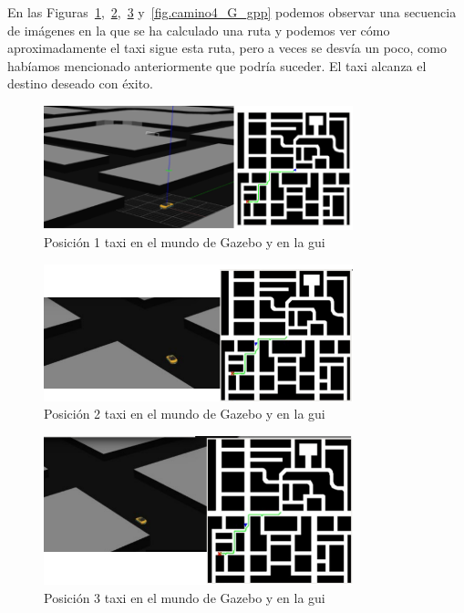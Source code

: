 En las Figuras~\ref{fig.camino1_G_gpp},~\ref{fig.camino2_G_gpp},~\ref{fig.camino3_G_gpp} y~\ref{fig.camino4_G_gpp} podemos observar una secuencia de imágenes en la que se ha calculado una ruta y podemos ver cómo aproximadamente el taxi sigue esta ruta, pero a veces se desvía un poco, como habíamos mencionado anteriormente que podría suceder. El taxi alcanza el destino deseado con éxito.

\begin{figure}[H]
  \begin{center}
    \includegraphics[width=0.8\textwidth]{figures/GPP/camino1_G.png}
		\caption{Posición 1 taxi en el mundo de Gazebo y en la \acrshort{gui}}
		\label{fig.camino1_G_gpp}
		\end{center}
\end{figure}

\begin{figure}[H]
  \begin{center}
    \includegraphics[width=0.8\textwidth]{figures/GPP/camino2_G.png}
		\caption{Posición 2 taxi en el mundo de Gazebo y en la \acrshort{gui}}
		\label{fig.camino2_G_gpp}
		\end{center}
\end{figure}

\begin{figure}[H]
  \begin{center}
    \includegraphics[width=0.8\textwidth]{figures/GPP/camino3_G.png}
		\caption{Posición 3 taxi en el mundo de Gazebo y en la \acrshort{gui}}
		\label{fig.camino3_G_gpp}
		\end{center}
\end{figure}

